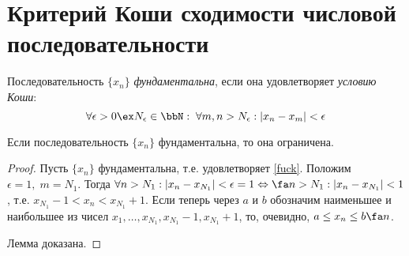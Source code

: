 \section{Критерий Коши сходимости числовой последовательности}

\begin{defn}
Последовательность $\{x_n\}$ \textit{фундаментальна}, если она удовлетворяет \textit{условию Коши}:
\begin{equation}
\label{fuck}
\forall \epsilon >0 \ex N_{\epsilon} \in \bbN: \;\forall m,n > N_{\epsilon}: |x_n-x_m|<\epsilon  
\end{equation}
\end{defn}

\begin{lemm}
\label{lemm1}
Если последовательность $\{x_n\}$ фундаментальна, то она ограничена.
\end{lemm}
\begin{proof}
Пусть $\{x_n\}$ фундаментальна, т.е. удовлетворяет \eqref{fuck}. Положим $\epsilon = 1,\; m = N_1$. Тогда $\forall n > N_1:\\ |x_n-x_{N_1}| <\epsilon = 1 \Leftrightarrow \fa n > N_1: |x_n - x_{N_1}| < 1$, т.е. $x_{N_1} - 1< x_n < x_{N_1}+1$. Если теперь через $a$ и $b$ обозначим наименьшее и наибольшее из чисел $x_1,\dots,x_{N_1},x_{N_1}-1,x_{N_1}+1$, то, очевидно, $a \le x_n \le b \fa n$.

Лемма доказана.
\end{proof}

